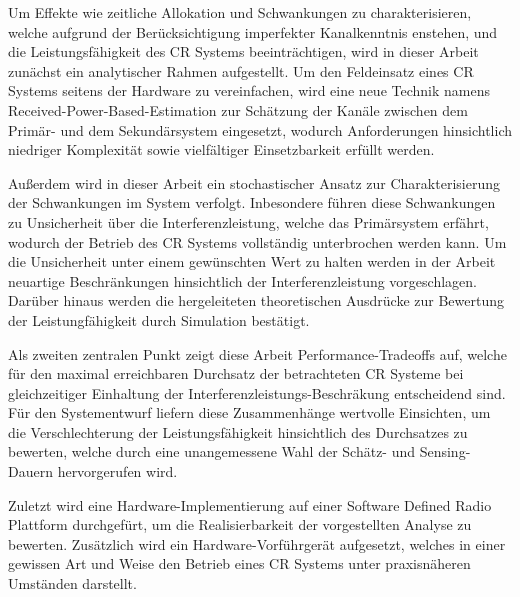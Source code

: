Um Effekte wie zeitliche Allokation und Schwankungen zu charakterisieren, welche aufgrund der Ber\"ucksichtigung imperfekter Kanalkenntnis enstehen, und die Leistungsf\"ahigkeit des CR Systems beeintr\"achtigen, wird in dieser Arbeit zun\"achst ein analytischer Rahmen aufgestellt. Um den Feldeinsatz eines CR Systems seitens der Hardware zu vereinfachen, wird eine neue Technik namens Received-Power-Based-Estimation zur Sch\"atzung der Kan\"ale  zwischen dem Prim\"ar- und dem Sekund\"arsystem eingesetzt, wodurch Anforderungen hinsichtlich niedriger Komplexit\"at sowie vielf\"altiger Einsetzbarkeit erf\"ullt werden. 

Au\ss erdem wird in dieser Arbeit ein stochastischer Ansatz zur Charakterisierung der Schwankungen im System verfolgt. Inbesondere f\"uhren diese Schwankungen zu Unsicherheit \"uber die Interferenzleistung, welche das Prim\"arsystem erf\"ahrt, wodurch der Betrieb des CR Systems vollst\"andig unterbrochen werden kann. Um die Unsicherheit unter einem gew\"unschten Wert zu halten werden in der Arbeit neuartige Beschr\"ankungen hinsichtlich der Interferenzleistung vorgeschlagen. Dar\"uber hinaus werden die hergeleiteten theoretischen Ausdr\"ucke zur Bewertung der Leistungf\"ahigkeit durch Simulation best\"atigt. 

Als zweiten zentralen Punkt zeigt diese Arbeit Performance-Tradeoffs auf, welche f\"ur den maximal erreichbaren Durchsatz der betrachteten CR Systeme bei gleichzeitiger Einhaltung der Interferenzleistungs-Beschr\"akung entscheidend sind. F\"ur den Systementwurf liefern diese Zusammenh\"ange wertvolle Einsichten, um die Verschlechterung der Leistungsf\"ahigkeit hinsichtlich des Durchsatzes zu bewerten, welche durch eine unangemessene Wahl der Schätz- und Sensing-Dauern hervorgerufen wird.

Zuletzt wird eine Hardware-Implementierung auf einer Software Defined Radio Plattform durchgef\"urt, um die Realisierbarkeit der vorgestellten Analyse zu bewerten. Zus\"atzlich wird ein Hardware-Vorf\"uhrger\"at aufgesetzt, welches in einer gewissen Art und Weise den Betrieb eines CR Systems unter praxisn\"aheren Umst\"anden darstellt.

\cleardoublepage
